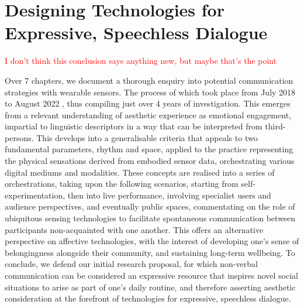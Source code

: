 \section{Designing Technologies for Expressive, Speechless Dialogue}
\textcolor{red}{I don't think this conclusion says anything new, but maybe that's the point}

Over 7 chapters, we document a thorough enquiry into potential communication strategies with wearable sensors. The process of which took place from July 2018 to August 2022
, thus compiling just over 4 years of investigation. This emerges from a relevant understanding of aesthetic experience as emotional engagement, impartial to linguistic descriptors in a way that can be interpreted from third-persons. This develops into a generalisable criteria that appeals to two fundamental parameters, rhythm and space, applied to the practice representing the physical sensations derived from embodied sensor data, orchestrating various digital mediums and modalities. These concepts are realised into a series of orchestrations, taking upon the following scenarios, starting from self-experimentation, then into live performance, involving specialist users and audience perspectives, and eventually public spaces, commentating on the role of ubiquitous sensing technologies to facilitate spontaneous communication between participants non-acquainted with one another. This offers an alternative perspective on affective technologies, with the interest of developing one's sense of belongingness alongside their community, and sustaining long-term wellbeing. To conclude, we defend our initial research proposal, for which non-verbal communication can be considered an expressive resource that inspires novel social situations to arise as part of one's daily routine, and therefore asserting aesthetic consideration at the forefront of technologies for expressive, speechless dialogue.

\begin{quote}

\end{quote}


